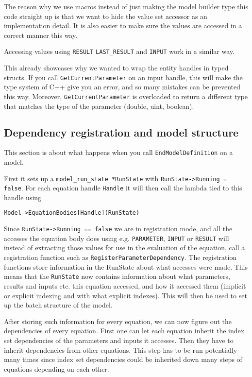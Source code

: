 \documentclass[11pt]{article}
\theoremstyle{definition}
\begin{document}
The reason why we use macros instead of just making the model builder type this code straight up is that we want to hide the value set accessor as an implementation detail. It is also easier  to make sure the values are accessed in a correct manner this way.

Accessing values using {\tt RESULT} {\tt LAST\_RESULT} and {\tt INPUT} work in a similar way.

This already showcases why we wanted to wrap the entity handles in typed structs. If you call {\tt GetCurrentParameter} on an input handle, this will make the type system of C++ give you an error, and so many mistakes can be prevented this way. Moreover, {\tt GetCurrentParameter} is overloaded to return a different type that matches the type of the parameter (double, uint, boolean).

\subsection{Dependency registration and model structure}

This section is about what happens when you call {\tt EndModelDefinition} on a model.

First it sets up a {\tt model\_run\_state *RunState} with {\tt RunState->Running = false}. For each equation handle {\tt Handle} it will then call the lambda tied to this handle using
\begin{lstlisting}[style=mycpp]
Model->EquationBodies[Handle](RunState)
\end{lstlisting}
Since {\tt RunState->Running == false} we are in registration mode, and all the accesses the equation body does using e.g. {\tt PARAMETER}, {\tt INPUT} or {\tt RESULT} will instead of extracting those values for use in the evaluation of the equation, call a registration function such as {\tt RegisterParameterDependency}. The registration functions store information in the RunState about what accesses were made. This means that the {\tt RunState} now contains information about what parameters, results and inputs etc. this equation accessed, and how it accessed them (implicit or explicit indexing and with what explicit indexes). This will then be used to set up the batch structure of the model.

After storing such information for every equation, we can now figure out the dependencies of every equation. First one can let each equation inherit the index set dependencies of the parameters and inputs it accesses. Then they have to inherit dependencies from other equations. This step has to be run potentially many times since index set dependencies could be inherited down many steps of equations depending on each other.
\end{document}
